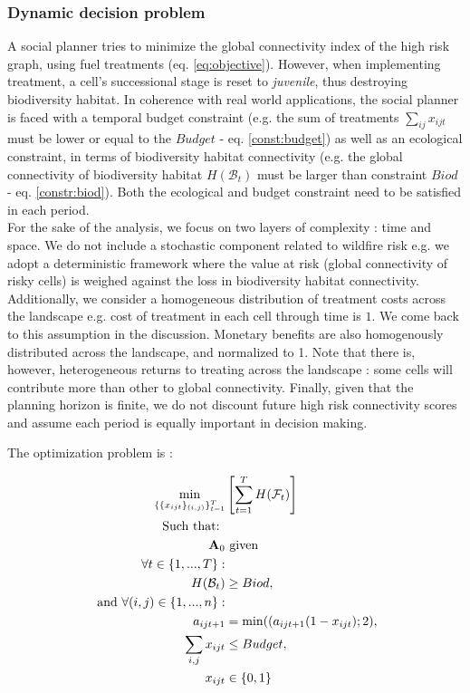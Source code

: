 \subsubsection{Dynamic decision problem}
A social planner tries to minimize the global connectivity index of the high risk graph, using fuel treatments (eq. \ref{eq:objective}). However, when implementing treatment, a cell's successional stage is reset to \textit{juvenile}, thus destroying biodiversity habitat. In coherence with real world applications, the social planner is faced with a temporal budget constraint (e.g. the sum of treatments $\sum_{ij}x_{ijt}$ must be lower or equal to the $Budget$ - eq. \ref{const:budget}) as well as an ecological constraint, in terms of biodiversity habitat connectivity (e.g. the global connectivity of biodiversity habitat $H(\mathcal{B}_t)$ must be larger than constraint $Biod$ - eq. \ref{constr:biod}). Both the ecological and budget constraint need to be satisfied in each period.
\\
For the sake of the analysis, we focus on two layers of complexity : time and space. We do not include a stochastic component related to wildfire risk e.g. we adopt a deterministic framework where the value at risk (global connectivity of risky cells) is weighed against the loss in biodiversity habitat connectivity. Additionally, we consider a homogeneous distribution of treatment costs across the landscape e.g. cost of treatment in each cell through time is $1$. We come back to this assumption in the discussion. Monetary benefits are also homogenously distributed across the landscape, and normalized to 1. Note that there is, however, heterogeneous returns to treating across the landscape : some cells will contribute more than other to global connectivity. Finally, given that the planning horizon is finite, we do not discount future high risk connectivity scores and assume each period is equally important in decision making.

\clearpage

The optimization problem is : 

\begin{align}
    \min_{ \{\{x_{ijt}\}_{(i,j)}\}_{t=1}^T} & \left[ \sum_{t=1}^T H(\mathcal{F}_t)\right] \label{eq:objective}\\
\text{Such that: } & \notag \\
\mathbf{A}_0 &\text{ given} \label{eq:init_cond}\\
\forall t \in \{1, ..., T\} : & \notag \\
H(\mathcal{B}_t)&\geq Biod,\text{  }\label{constr:biod}\\
\text{ and }\forall (i,j) \in \{1,...,n\}   :& \notag \\
a_{ijt+1}& = \min((a_{ijt+1}(1-x_{ijt});2), \label{const:dyn}\\
 \sum_{i,j} x_{ijt} & \leq Budget,\text{  } \label{const:budget}\\
x_{ijt}&\in \{0,1\}\label{const:control}
\end{align}

